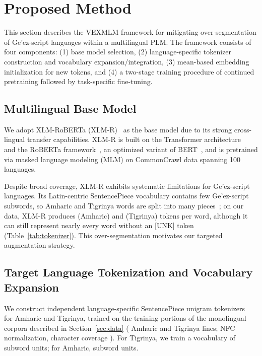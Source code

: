 \section{Proposed Method}

This section describes the VEXMLM framework for mitigating over-segmentation of Ge'ez-script languages within a multilingual PLM. The framework consists of four components: (1) base model selection, (2) language-specific tokenizer construction and vocabulary expansion/integration, (3) mean-based embedding initialization for new tokens, and (4) a two-stage training procedure of continued pretraining followed by task-specific fine-tuning.

\subsection{Multilingual Base Model}
We adopt XLM-RoBERTa (XLM-R)~\cite{conneau2020unsupervised} as the base model due to its strong cross-lingual transfer capabilities. XLM-R is built on the Transformer architecture~\cite{vaswani2017attention} and the RoBERTa framework~\cite{liu2019roberta}, an optimized variant of BERT~\cite{devlin2019bert}, and is pretrained via masked language modeling (MLM) on CommonCrawl data spanning 100 languages.

Despite broad coverage, XLM-R exhibits systematic limitations for Ge'ez-script languages. Its Latin-centric SentencePiece vocabulary contains few Ge'ez-script subwords, so Amharic and Tigrinya words are split into many pieces~\cite{zhang2022robust,ahia2023all}; on our data, XLM-R produces \tokXlmrAmhFertility{} (Amharic) and \tokXlmrTirFertility{} (Tigrinya) tokens per word, although it can still represent nearly every word without an [UNK] token (Table~\ref{tab:tokenizer}). This over-segmentation motivates our targeted augmentation strategy.

\subsection{Target Language Tokenization and Vocabulary Expansion}
We construct independent language-specific SentencePiece unigram tokenizers~\cite{kudo2018sentencepiece} for Amharic and Tigrinya, trained on the training portions of the monolingual corpora described in Section~\ref{sec:data} (\spmAmhTrainLines{} Amharic and \spmTirTrainLines{} Tigrinya lines; NFC normalization, character coverage \spmCharCoverage). For Tigrinya, we train a vocabulary of \spmTirVocab{} subword units; for Amharic, \spmAmhVocab{} subword units.


